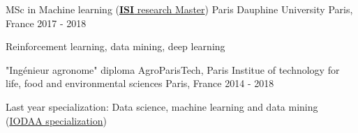 

\begin{cventries}

  \cventry
    {MSc in Machine learning (\href{https://mido.dauphine.fr/fr/formations-et-diplomes/masters-2/master-2-informatique/parcours-isi/presentation.html}{\textbf{ISI} research Master})} %
    {Paris Dauphine University} %
    {Paris, France} %
    {2017 - 2018} %
    {
      \begin{cvitems} %
        \item {Reinforcement learning, data mining, deep learning} 
      \end{cvitems}
    }
  
    \cventry
    {"Ingénieur agronome" diploma} %
    {AgroParisTech, Paris Institue of technology for life, food and environmental sciences} %
    {Paris, France} %
    {2014 - 2018} %
    {
      \begin{cvitems} %
        \item {Last year specialization: Data science, machine learning and data mining (\href{http://www2.agroparistech.fr/ufr-info/iodaa/}{IODAA specialization})}%
      \end{cvitems}
    }


\end{cventries}
